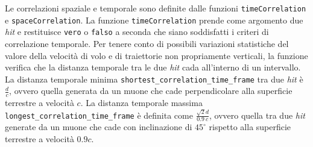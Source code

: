 \documentclass[../main.tex]{subfiles}
\begin{document}
Le correlazioni spaziale e temporale sono definite dalle funzioni \texttt{timeCorrelation} e \texttt{spaceCorrelation}.
La funzione \texttt{timeCorrelation} prende come argomento due \emph{hit} e restituisce \texttt{vero} o \texttt{falso} a seconda che siano soddisfatti i criteri di correlazione temporale.
Per tenere conto di possibili variazioni statistiche del valore della velocità di volo e di traiettorie non propriamente verticali, la funzione verifica che la distanza temporale tra le due \emph{hit} cada all'interno di un intervallo.
La distanza temporale minima \texttt{shortest\_correlation\_time\_frame} tra due \emph{hit} è $\frac{d}{c}$, ovvero quella generata da un muone che cade perpendicolare alla superficie terrestre a velocità $c$.
La distanza temporale massima \texttt{longest\_correlation\_time\_frame} è definita come $\frac{\sqrt{2}d}{0.9\ c}$, ovvero quella tra due \emph{hit} generate da un muone che cade con inclinazione di $45^\circ$ rispetto alla superficie terrestre a velocità $0.9c$.


\end{document}
